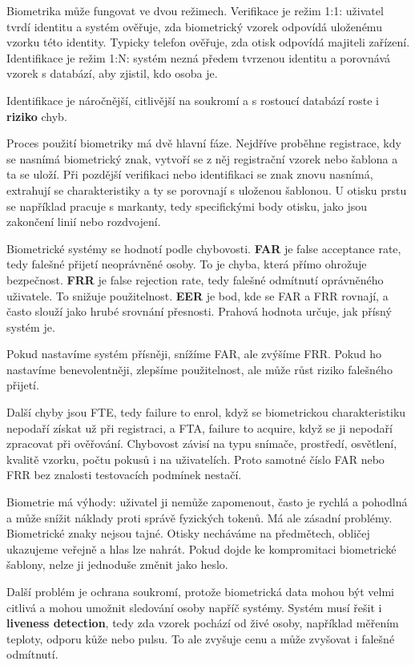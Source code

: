 Biometrika může fungovat ve dvou režimech. Verifikace je režim 1:1: uživatel tvrdí identitu a systém ověřuje, zda biometrický vzorek odpovídá uloženému vzorku této identity. Typicky telefon ověřuje, zda otisk odpovídá majiteli zařízení. Identifikace je režim 1:N: systém nezná předem tvrzenou identitu a porovnává vzorek s databází, aby zjistil, kdo osoba je.

Identifikace je náročnější, citlivější na soukromí a s rostoucí databází roste i \textbf{riziko} chyb.

Proces použití biometriky má dvě hlavní fáze. Nejdříve proběhne registrace, kdy se nasnímá biometrický znak, vytvoří se z něj registrační vzorek nebo šablona a ta se uloží. Při pozdější verifikaci nebo identifikaci se znak znovu nasnímá, extrahují se charakteristiky a ty se porovnají s uloženou šablonou. U otisku prstu se například pracuje s markanty, tedy specifickými body otisku, jako jsou zakončení linií nebo rozdvojení.

Biometrické systémy se hodnotí podle chybovosti. \textbf{FAR} je false acceptance rate, tedy falešné přijetí neoprávněné osoby. To je chyba, která přímo ohrožuje bezpečnost. \textbf{FRR} je false rejection rate, tedy falešné odmítnutí oprávněného uživatele. To snižuje použitelnost. \textbf{EER} je bod, kde se FAR a FRR rovnají, a často slouží jako hrubé srovnání přesnosti. Prahová hodnota určuje, jak přísný systém je.

Pokud nastavíme systém přísněji, snížíme FAR, ale zvýšíme FRR. Pokud ho nastavíme benevolentněji, zlepšíme použitelnost, ale může růst riziko falešného přijetí.

Další chyby jsou FTE, tedy failure to enrol, když se biometrickou charakteristiku nepodaří získat už při registraci, a FTA, failure to acquire, když se ji nepodaří zpracovat při ověřování. Chybovost závisí na typu snímače, prostředí, osvětlení, kvalitě vzorku, počtu pokusů i na uživatelích. Proto samotné číslo FAR nebo FRR bez znalosti testovacích podmínek nestačí.

Biometrie má výhody: uživatel ji nemůže zapomenout, často je rychlá a pohodlná a může snížit náklady proti správě fyzických tokenů. Má ale zásadní problémy. Biometrické znaky nejsou tajné. Otisky necháváme na předmětech, obličej ukazujeme veřejně a hlas lze nahrát. Pokud dojde ke kompromitaci biometrické šablony, nelze ji jednoduše změnit jako heslo.

Další problém je ochrana soukromí, protože biometrická data mohou být velmi citlivá a mohou umožnit sledování osoby napříč systémy. Systém musí řešit i \textbf{liveness detection}, tedy zda vzorek pochází od živé osoby, například měřením teploty, odporu kůže nebo pulsu. To ale zvyšuje cenu a může zvyšovat i falešné odmítnutí.


